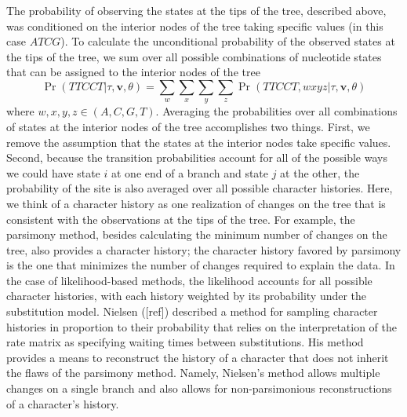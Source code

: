 \documentclass{svmult}
\begin{document}
The probability of observing the states at the tips of the tree, described above, was conditioned
on the interior nodes of the tree taking specific values (in this case $ATCG$). To calculate the
unconditional probability of the observed states at the tips of the tree, we sum over all possible
combinations of nucleotide states that can be assigned to the interior nodes of the tree
$$
\Pr(TTCCT | \tau, {\mathbf v}, \theta ) = \sum_{w} \sum_{x} \sum_{y} \sum_{z} 
\Pr(TTCCT , w x y z | \tau, {\mathbf v}, \theta )
$$
where $w,x,y,z \in  (A,C,G,T)$. Averaging the probabilities over all combinations of states at the
interior nodes of the tree accomplishes two things. First, we remove the assumption that the states
at the interior nodes take specific values. Second, because the transition probabilities account
for all of the possible ways we could have state $i$ at one end of a branch and state $j$ at the
other, the probability of the site is also averaged over all possible character histories. Here, we
think of a character history as one realization of changes on the tree that is consistent with the
observations at the tips of the tree. For example, the parsimony method, besides calculating the
minimum number of changes on the tree, also provides a character history; the character history
favored by parsimony is the one that minimizes the number of changes required to explain the data.
In the case of likelihood-based methods, the likelihood accounts for all possible character
histories, with each history weighted by its probability under the substitution model. Nielsen
([ref]) described a method for sampling character histories in proportion to their probability that
relies on the interpretation of the rate matrix as specifying waiting times between substitutions.
His method provides a means to reconstruct the history of a character that does not inherit the
flaws of the parsimony method. Namely, Nielsen's method allows multiple changes on a single branch
and also allows for non-parsimonious reconstructions of a character's history.
\end{document}
